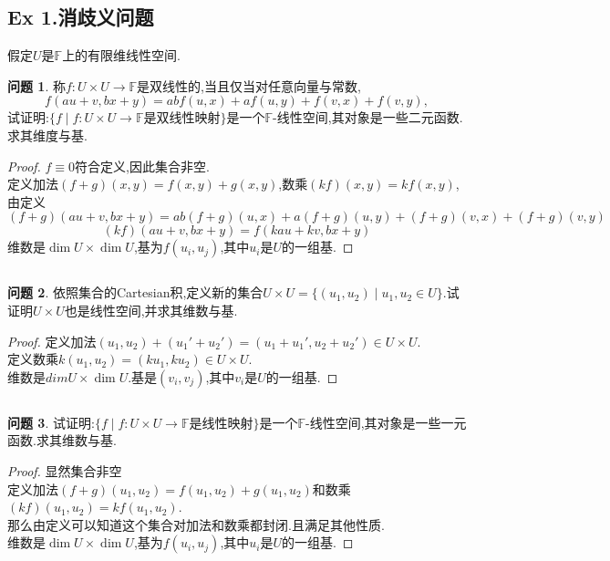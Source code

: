 \documentclass[11pt]{ctexart}
\theoremstyle{definition}
\newtheorem{qqq}{问题}[section]
\numberwithin{equation}{section}
\newcommand{\FF}{\mathbb{F}}%
\begin{document}
\subsection{Ex 1.消歧义问题}
假定$U$是$\FF$上的有限维线性空间.
\begin{qqq}
    称$f:U\times U \rightarrow \FF $是双线性的,当且仅当对任意向量与常数,
    \[f(au+v,bx+y)=abf(u,x)+af(u,y)+f(v,x)+f(v,y),\]
    试证明:$\{f\mid f:U\times U\rightarrow \FF\text{是双线性映射}\}$是一个$\FF$-线性空间,其对象是一些二元函数.求其维度与基.
\end{qqq}
\begin{proof}
    $f\equiv 0$符合定义,因此集合非空.\\
    定义加法$(f+g)(x,y)=f(x,y)+g(x,y)$,数乘$(kf)(x,y)=kf(x,y)$,
    由定义$$(f+g)(au+v,bx+y)=ab(f+g)(u,x)+a(f+g)(u,y)+(f+g)(v,x)+(f+g)(v,y)$$
    $$(kf)(au+v,bx+y)=f(kau+kv,bx+y)$$
    维数是$\dim U\times \dim U$,基为${f(u_i,u_j)}$,其中$u_i$是$U$的一组基.
\end{proof}
\[{}\]
\begin{qqq}
    依照集合的Cartesian积,定义新的集合$U\times U=\{(u_1,u_2)\mid u_1,u_2 \in U\}.$试证明$U\times U$也是线性空间,并求其维数与基.
\end{qqq}
\begin{proof}
     定义加法$(u_1,u_2)+(u_1'+u_2')=(u_1+u_1',u_2+u_2')\in U\times U$.\\
     定义数乘$k(u_1,u_2)=(ku_1,ku_2)\in U\times U$.\\
     维数是$dim U\times \dim U$.基是$(v_i,v_j)$,其中$v_i$是$U$的一组基.
\end{proof}
\[{}\]
\begin{qqq}
    试证明:$\{f\mid f: U\times U\rightarrow \FF \text{是线性映射}\}$是一个$\FF$-线性空间,其对象是一些一元函数.求其维数与基.
\end{qqq}
\begin{proof}
    显然集合非空\\
    定义加法$(f+g)(u_1,u_2)=f(u_1,u_2)+g(u_1,u_2)$和数乘$(kf)(u_1,u_2)=kf(u_1,u_2)$.\\
    那么由定义可以知道这个集合对加法和数乘都封闭.且满足其他性质.\\
    维数是$\dim U\times \dim U$,基为${f(u_i,u_j)}$,其中$u_i$是$U$的一组基.
\end{proof}
\newpage
\end{document}
